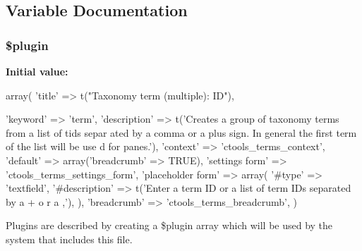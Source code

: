 \subsection{Variable Documentation}
\hypertarget{arguments_2terms_8inc_ada8a7130088351710bb02ed622d6bf65}{
\subsubsection[{\$plugin}]{\setlength{\rightskip}{0pt plus 5cm}\$plugin}}
\label{arguments_2terms_8inc_ada8a7130088351710bb02ed622d6bf65}
{\bfseries Initial value:}
\begin{DoxyCode}
 array(
  'title' => t("Taxonomy term (multiple): ID"),
  
  'keyword' => 'term',
  'description' => t('Creates a group of taxonomy terms from a list of tids separ
      ated by a comma or a plus sign. In general the first term of the list will be use
      d for panes.'),
  'context' => 'ctools_terms_context',
  'default' => array('breadcrumb' => TRUE),
  'settings form' => 'ctools_terms_settings_form',
  'placeholder form' => array(
    '#type' => 'textfield',
    '#description' => t('Enter a term ID or a list of term IDs separated by a + o
      r a ,'),
  ),
  'breadcrumb' => 'ctools_terms_breadcrumb',
)
\end{DoxyCode}
Plugins are described by creating a \$plugin array which will be used by the system that includes this file. 